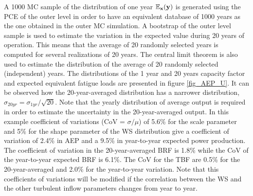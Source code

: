 \documentclass[preprint,12pt]{elsarticle}
\begin{document}
A 1000 MC sample of the distribution of one year $\mathbb{E}_{\mathbf{x}}(\mathbf{y})$ is generated using the PCE of the outer level in order to have an equivalent database of 1000 years as the one obtained in the outer MC simulation. A bootstrap of the outer level sample is used to estimate the variation in the expected value during 20 years of operation. This means that the average of 20 randomly selected years is computed for several realizations of 20 years. The central limit theorem is also used to estimate the distribution of the average of 20 randomly selected (independent) years. The distributions of the 1 year and 20 years capacity factor and expected equivalent fatigue loads are presented in figure \ref{fig_AEP_U}. It can be observed how the 20-year-averaged distribution has a narrower distribution, $\sigma_{20yr} = \sigma_{1yr}/\sqrt{20}$. Note that the yearly distribution of average output is required in order to estimate the uncertainty in the 20-year-averaged output. In this example coefficient of variations (CoV = $\sigma/\mu$) of 5.6\% for the scale parameter and 5\% for the shape parameter of the WS distribution give a coefficient of variation of 2.4\% in AEP and a 9.5\% in year-to-year expected power production. The coefficient of variation in the 20-year-averaged BRF is 1.8\% while the CoV of the year-to-year expected BRF is 6.1\%. The CoV for the TBF are 0.5\% for the 20-year-averaged and 2.0\% for the year-to-year variation. Note that this coefficients of variations will be modified if the correlation between the WS and the other turbulent inflow parameters changes from year to year.
\end{document}
